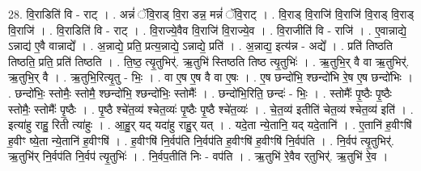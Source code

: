 \documentclass[17pt]{extarticle}
\begin{document}
28. वि॒राडिति॑ वि - राट् । . अन्नं॑ ॅवि॒राड् वि॒रा डन्न॒ मन्नं॑ ॅवि॒राट् । . वि॒राड् वि॒राजि॑ वि॒राजि॑ वि॒राड् वि॒राड् वि॒राजि॑ । . वि॒राडिति॑ वि - राट् । . वि॒राज्ये॒वैव वि॒राजि॑ वि॒राज्ये॒व । . वि॒राजीति॑ वि - राजि॑ । . ए॒वान्नाद्ये॒ ऽन्नाद्य॑ ए॒वै वान्नाद्ये᳚ । . अ॒न्नाद्ये॒ प्रति॒ प्रत्य॒न्नाद्ये॒ ऽन्नाद्ये॒ प्रति॑ । . अ॒न्नाद्य॒ इत्य॑न्न - अद्ये᳚ । . प्रति॑ तिष्ठति तिष्ठति॒ प्रति॒ प्रति॑ तिष्ठति । . ति॒ष्ठ॒ त्यृ॒तुभिर्॑. ऋ॒तुभि॑ स्तिष्ठति तिष्ठ त्यृ॒तुभिः॑ । . ऋ॒तुभि॒र् वै वा ऋ॒तुभिर्॑. ऋ॒तुभि॒र् वै । . ऋ॒तुभि॒रित्यृ॒तु - भिः॒ । . वा ए॒ष ए॒ष वै वा ए॒षः । . ए॒ष छन्दो॑भि॒ श्छन्दो॑भि रे॒ष ए॒ष छन्दो॑भिः । . छन्दो॑भिः॒ स्तोमैः॒ स्तोमै॒ श्छन्दो॑भि॒ श्छन्दो॑भिः॒ स्तोमैः᳚ । . छन्दो॑भि॒रिति॒ छन्दः॑ - भिः॒ । . स्तोमैः᳚ पृ॒ष्ठैः पृ॒ष्ठैः स्तोमैः॒ स्तोमैः᳚ पृ॒ष्ठैः । . पृ॒ष्ठै श्चे॑त॒व्य॑ श्चेत॒व्यः॑ पृ॒ष्ठैः पृ॒ष्ठै श्चे॑त॒व्यः॑ । . चे॒त॒व्य॑ इतीति॑ चेत॒व्य॑ श्चेत॒व्य॑ इति॑ । . इत्या॑हु राहु॒ रिती त्या॑हुः । . आ॒हु॒र् यद् यदा॑हु राहु॒र् यत् । . यदे॒ता न्ये॒तानि॒ यद् यदे॒तानि॑ । . ए॒तानि॑ ह॒वीꣳषि॑ ह॒वीꣳ ष्ये॒ता न्ये॒तानि॑ ह॒वीꣳषि॑ । . ह॒वीꣳषि॑ नि॒र्वप॑ति नि॒र्वप॑ति ह॒वीꣳषि॑ ह॒वीꣳषि॑ नि॒र्वप॑ति । . नि॒र्वप॑ त्यृ॒तुभिर्॑. ऋ॒तुभि॑र् नि॒र्वप॑ति नि॒र्वप॑ त्यृ॒तुभिः॑ । . नि॒र्वप॒तीति॑ निः - वप॑ति । . ऋ॒तुभि॑ रे॒वैव र्‌तुभिर्॑. ऋ॒तुभि॑ रे॒व । \newline
\end{document}
